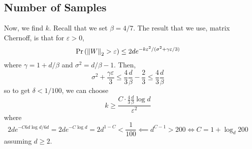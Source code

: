 \documentclass{article}
\begin{document}
\subsection{Number of Samples}
Now, we find $k$. Recall that we set $\beta = 4/7$. The result that we use, matrix Chernoff, is that for $\varepsilon>0$,
\[
	\Pr\left(\left\Vert W\right\Vert_2>\varepsilon\right)\leq 2de^{-k\varepsilon^2/(\sigma^2+\gamma\varepsilon/3)}
\]
where $\gamma = 1+d/\beta$ and $\sigma^2 = d/\beta - 1$. Then,
\[
	\sigma^2 + \frac{\gamma\varepsilon}3\leq \frac43\frac{d}{\beta} - \frac23\leq \frac43\frac{d}{\beta}
\]
so to get $\delta < 1/100$, we can choose
\[
	k\geq \frac{C\cdot \frac43\frac{d}{\beta}\log d}{\varepsilon^2}
\]
where
\[
	2de^{-C6d\log d/6d} = 2de^{-C\log d} = 2d^{1-C}<\frac1{100}\impliedby d^{C-1}>200\iff C = 1 + \log_d 200
\]
assuming $d\geq 2$. 



\end{document}
